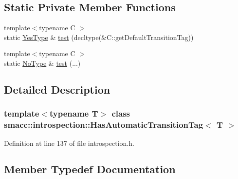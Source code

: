 \subsection*{Static Private Member Functions}
\begin{DoxyCompactItemize}
\item 
{\footnotesize template$<$typename C $>$ }\\static \hyperlink{classsmacc_1_1introspection_1_1HasAutomaticTransitionTag_a750a08a185de0fa20331ba7cfc531dde}{Yes\+Type} \& \hyperlink{classsmacc_1_1introspection_1_1HasAutomaticTransitionTag_a9de2266c38ff1f570674289f32b0faaf}{test} (decltype(\&C\+::get\+Default\+Transition\+Tag))
\item 
{\footnotesize template$<$typename C $>$ }\\static \hyperlink{classsmacc_1_1introspection_1_1HasAutomaticTransitionTag_ab81e7f76862ba064df3fd8e78b3864c4}{No\+Type} \& \hyperlink{classsmacc_1_1introspection_1_1HasAutomaticTransitionTag_aa38a947c16db7a23eefa754ba2c90782}{test} (...)
\end{DoxyCompactItemize}


\subsection{Detailed Description}
\subsubsection*{template$<$typename T$>$\newline
class smacc\+::introspection\+::\+Has\+Automatic\+Transition\+Tag$<$ T $>$}



Definition at line 137 of file introspection.\+h.



\subsection{Member Typedef Documentation}
\mbox{\label{classsmacc_1_1introspection_1_1HasAutomaticTransitionTag_ab81e7f76862ba064df3fd8e78b3864c4}} 
